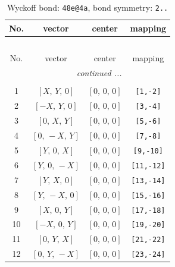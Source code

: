 \documentclass[fleqn,8pt]{jsarticle}
\begin{document}
\begin{longtable}{cccc}
\caption{Wyckoff bond: {\tt 48e@4a}, bond symmetry: {\tt 2..}}
 \\
 \hline \hline
No. & vector & center & mapping \\ \hline \endfirsthead

\multicolumn{3}{l}{\tablename\ \thetable{}} \\
 \hline \hline
No. & vector & center & mapping \\ \hline \endhead

 \hline \hline
\multicolumn{3}{r}{\footnotesize\it continued ...} \\ \endfoot

 \hline \hline
\multicolumn{3}{r}{} \\ \endlastfoot

1 & $\left[ X,\, Y,\, 0 \right]$ & $\left[ 0,\, 0,\, 0 \right]$ & {\tt [1,-2]} \\ \hline
2 & $\left[ - X,\, Y,\, 0 \right]$ & $\left[ 0,\, 0,\, 0 \right]$ & {\tt [3,-4]} \\ \hline
3 & $\left[ 0,\, X,\, Y \right]$ & $\left[ 0,\, 0,\, 0 \right]$ & {\tt [5,-6]} \\ \hline
4 & $\left[ 0,\, - X,\, Y \right]$ & $\left[ 0,\, 0,\, 0 \right]$ & {\tt [7,-8]} \\ \hline
5 & $\left[ Y,\, 0,\, X \right]$ & $\left[ 0,\, 0,\, 0 \right]$ & {\tt [9,-10]} \\ \hline
6 & $\left[ Y,\, 0,\, - X \right]$ & $\left[ 0,\, 0,\, 0 \right]$ & {\tt [11,-12]} \\ \hline
7 & $\left[ Y,\, X,\, 0 \right]$ & $\left[ 0,\, 0,\, 0 \right]$ & {\tt [13,-14]} \\ \hline
8 & $\left[ Y,\, - X,\, 0 \right]$ & $\left[ 0,\, 0,\, 0 \right]$ & {\tt [15,-16]} \\ \hline
9 & $\left[ X,\, 0,\, Y \right]$ & $\left[ 0,\, 0,\, 0 \right]$ & {\tt [17,-18]} \\ \hline
10 & $\left[ - X,\, 0,\, Y \right]$ & $\left[ 0,\, 0,\, 0 \right]$ & {\tt [19,-20]} \\ \hline
11 & $\left[ 0,\, Y,\, X \right]$ & $\left[ 0,\, 0,\, 0 \right]$ & {\tt [21,-22]} \\ \hline
12 & $\left[ 0,\, Y,\, - X \right]$ & $\left[ 0,\, 0,\, 0 \right]$ & {\tt [23,-24]} \\
\end{longtable}
\renewcommand{\arraystretch}{1.2}
\end{document}
